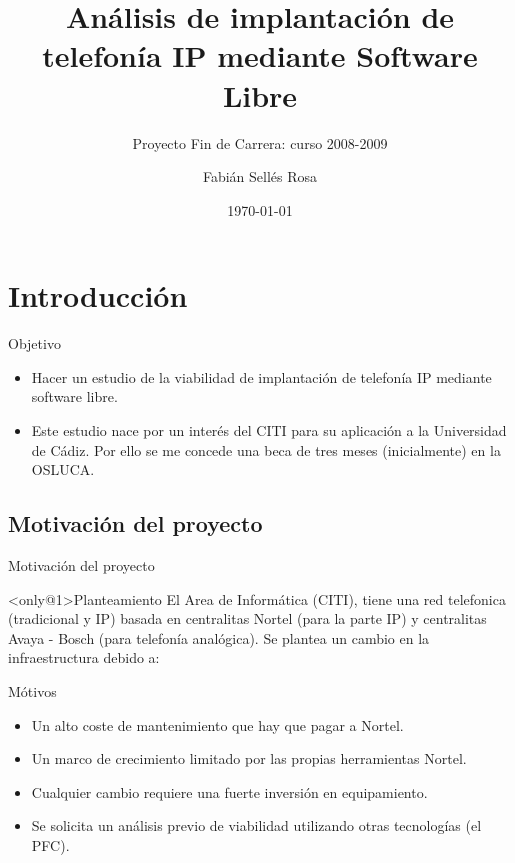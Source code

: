 \documentclass{beamer}
\author{Fabián Sellés Rosa}
\institute[UCA]{Universidad de Cádiz}
\title[Análisis de VoIP con software libre.]{Análisis de implantación de telefonía IP mediante Software Libre}
\subtitle{Proyecto Fin de Carrera: curso 2008-2009}
\date{\today}
\begin{document}
\begin{frame}
  \titlepage
\end{frame}

\begin{frame}
\tableofcontents[hideallsubsections]
\end{frame}
\section{Introducción}

\begin{frame}
  \begin{block}{Objetivo}
    \begin{itemize}
    \item Hacer un estudio de la viabilidad de implantación de telefonía IP mediante software libre.
    \item Este estudio nace por un interés del CITI para su aplicación a la Universidad de Cádiz. Por ello se me concede una beca de tres meses (inicialmente) en la OSLUCA.
    \end{itemize}
  \end{block}
  

\end{frame}
\subsection{Motivación del proyecto}
\label{sec:motiv-del-proy}

\begin{frame}{Motivación del proyecto}
\begin{block}<only@1>{Planteamiento}
   El Area de Informática (CITI), tiene una red telefonica (tradicional y IP) basada en centralitas Nortel (para la parte IP) y centralitas Avaya - Bosch (para telefonía analógica). Se plantea un cambio en la infraestructura debido a:
  \end{block}
  \begin{block}{Mótivos}
    \begin{itemize}
    \item<2-> Un alto coste de mantenimiento que hay que pagar a Nortel.
    \item<3-> Un marco de crecimiento limitado por las propias herramientas Nortel.
    \item<4-> Cualquier cambio requiere una fuerte inversión en equipamiento.
    \item<5- |alert@5> Se solicita un análisis previo de viabilidad utilizando otras tecnologías (el PFC).
    \end{itemize}
  \end{block}

\end{frame}
\end{document}
